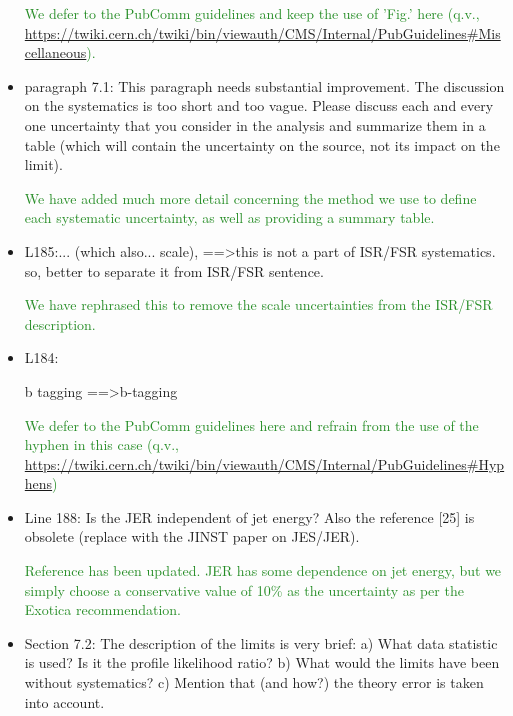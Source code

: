 \documentclass[paper=a4, fontsize=11pt]{scrartcl}
\begin{document}
\begin{itemize}
\textcolor{ForestGreen}{We defer to the PubComm guidelines and keep the use of 'Fig.' here
(q.v., \url{https://twiki.cern.ch/twiki/bin/viewauth/CMS/Internal/PubGuidelines\#Miscellaneous}).}\\


\item paragraph 7.1: 
This paragraph needs substantial improvement. The discussion on the 
systematics is too short and too vague. Please discuss each and every one 
uncertainty that you consider in the analysis and summarize them in a table 
(which will contain the uncertainty on the source, not its impact on the 
limit). 

\textcolor{ForestGreen}{We have added much more detail concerning the method
we use to define each systematic uncertainty, as well as providing a summary
table.}\\



\item L185:... (which also... scale), ==\textgreater this is not a part of ISR/FSR 
systematics. so, better to separate it from ISR/FSR sentence.

\textcolor{ForestGreen}{We have rephrased this to remove the scale uncertainties from the ISR/FSR description.}\\


\item L184: 

b tagging ==\textgreater b-tagging 

\textcolor{ForestGreen}{We defer to the PubComm guidelines here and refrain from the use of the hyphen
in this case (q.v., \url{https://twiki.cern.ch/twiki/bin/viewauth/CMS/Internal/PubGuidelines\#Hyphens})}\\


\item Line 188: 
Is the JER independent of jet energy? Also the reference [25] is obsolete 
(replace with the JINST paper on JES/JER). 

\textcolor{ForestGreen}{Reference has been updated. JER has some dependence on jet energy,
but we simply choose a conservative value of 10\% as the uncertainty as per the Exotica
recommendation.}\\

\item Section 7.2: 
The description of the limits is very brief: 
a) What data statistic is used? Is it the profile likelihood ratio? 
b) What would the limits have been without systematics? 
c) Mention that (and how?) the theory error is taken into account. 


\end{itemize}
\end{document}
